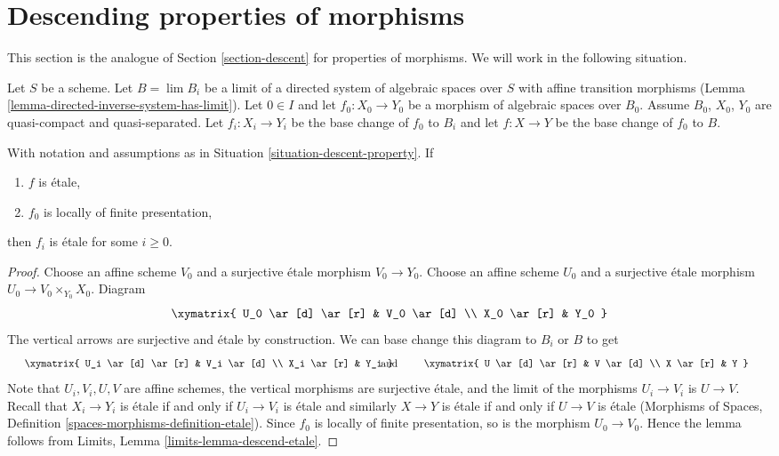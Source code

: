 \section{Descending properties of morphisms}
\label{section-descent-of-properties}

\noindent
This section is the analogue of Section \ref{section-descent}
for properties of morphisms. We will work in the following situation.

\begin{situation}
\label{situation-descent-property}
Let $S$ be a scheme. Let $B = \lim B_i$ be a limit of a directed system
of algebraic spaces over $S$ with affine transition morphisms
(Lemma \ref{lemma-directed-inverse-system-has-limit}).
Let $0 \in I$ and let $f_0 : X_0 \to Y_0$ be a morphism of algebraic spaces
over $B_0$. Assume $B_0$, $X_0$, $Y_0$ are quasi-compact and quasi-separated.
Let $f_i : X_i \to Y_i$ be the base change of $f_0$ to $B_i$ and
let $f : X \to Y$ be the base change of $f_0$ to $B$.
\end{situation}

\begin{lemma}
\label{lemma-descend-etale}
With notation and assumptions as in
Situation \ref{situation-descent-property}. If
\begin{enumerate}
\item $f$ is \'etale,
\item $f_0$ is locally of finite presentation,
\end{enumerate}
then $f_i$ is \'etale for some $i \geq 0$.
\end{lemma}

\begin{proof}
Choose an affine scheme $V_0$ and a surjective \'etale morphism
$V_0 \to Y_0$. Choose an affine scheme $U_0$ and a surjective \'etale
morphism $U_0 \to V_0 \times_{Y_0} X_0$. Diagram
$$
\xymatrix{
U_0 \ar[d] \ar[r] & V_0 \ar[d] \\
X_0 \ar[r] & Y_0
}
$$
The vertical arrows are surjective and \'etale by construction.
We can base change this diagram to $B_i$ or $B$ to get
$$
\vcenter{
\xymatrix{
U_i \ar[d] \ar[r] & V_i \ar[d] \\
X_i \ar[r] & Y_i
}
}
\quad\text{and}\quad
\vcenter{
\xymatrix{
U \ar[d] \ar[r] & V \ar[d] \\
X \ar[r] & Y
}
}
$$
Note that $U_i, V_i, U, V$ are affine schemes,
the vertical morphisms are surjective \'etale, and the limit of the
morphisms $U_i \to V_i$ is $U \to V$. Recall that $X_i \to Y_i$ is \'etale
if and only if $U_i \to V_i$ is
\'etale and similarly $X \to Y$ is \'etale if and only if
$U \to V$ is \'etale
(Morphisms of Spaces, Definition \ref{spaces-morphisms-definition-etale}).
Since $f_0$ is locally of finite
presentation, so is the morphism $U_0 \to V_0$. Hence the lemma follows
from Limits, Lemma \ref{limits-lemma-descend-etale}.
\end{proof}

